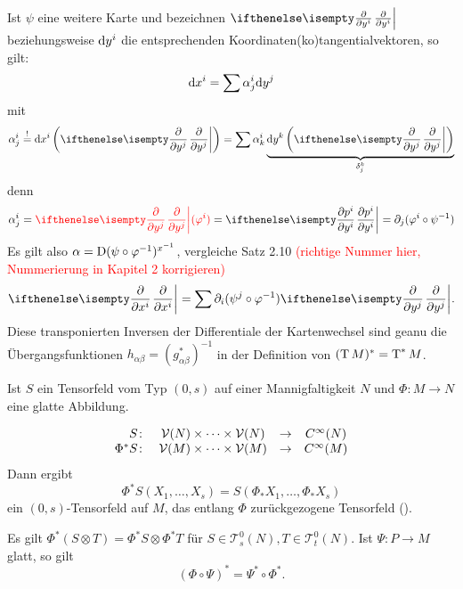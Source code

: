 Ist $\psi$ eine weitere Karte und bezeichnen $\pdifffrac{}{y^i}$ beziehungsweise $\mathrm{d} y^i$ die entsprechenden Koordinaten(ko)tangentialvektoren, so gilt:
	\[ \mathrm{d} x^i = \sum \alpha_j^i\mathrm{d} y^j \]
mit
	\[ \alpha_j^i \overset{!}{=} \dop x^i\left(\pdifffrac{}{y^j}\right) = \sum \alpha_k^i \underbrace{\dop y^k\left(\pdifffrac{}{y^j}\right)}_{\delta_j^k} \]
denn
	\[ \alpha_j^i = \textcolor{red}{\pdifffrac{}{y^j}(\varphi^i)} = \pdifffrac{p^i}{y^i} = \partial_j(\varphi^i\circ \psi^{-1}) \]
Es gilt also $\alpha = \operatorname{D}(\psi \circ \varphi^{-1})^{x^{-1}}$, vergleiche Satz 2.10 \textcolor{red}{(richtige Nummer hier, Nummerierung in Kapitel 2 korrigieren)}
\begin{align*}
  \pdifffrac{}{x^i} = \sum \partial_i (\psi^j \circ \varphi^{-1})\pdifffrac{}{y^j}.
\end{align*}
Diese transponierten Inversen der Differentiale der Kartenwechsel sind geanu die Übergangsfunktionen $h_{\alpha\beta} = (g_{\alpha\beta}^{*})^{-1}$ in der Definition von $(\operatorname{T} M)^{*} = \operatorname{T}^{*}M$.

Ist $S$ ein Tensorfeld vom Typ $(0,s)$ auf einer Mannigfaltigkeit $N$ und $\Phi \colon M \to N$ eine glatte Abbildung.
\begin{center}\end{center}
	\[ \begin{array}{rccc} S \colon & \mathcal V(N) \times \cdots \times \mathcal V(N) &\to& C^{\infty}(N)\\
		\Phi^{*}S \colon & \mathcal V(M) \times \cdots \times \mathcal V(M) &\to& C^{\infty}(M) \end{array} \]
Dann ergibt
	\[ \Phi^{*}S(X_{1},\ldots,X_{s}) = S(\Phi_{*}X_{1},\ldots,\Phi_{*}X_{s}) \]
ein $(0,s)$-Tensorfeld auf $M$, das entlang $\Phi$ zurückgezogene Tensorfeld ().

Es gilt $\Phi^{*}(S \otimes T) = \Phi^{*}S \otimes \Phi^{*}T$ für $S \in \mathcal T_s^0(N), T \in \mathcal T_t^0(N)$.
Ist $\Psi \colon P \to M$ glatt, so gilt
	\[ (\Phi \circ \Psi)^{*} = \Psi^{*} \circ \Phi^{*}.\]

